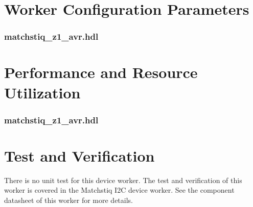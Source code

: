 \documentclass{article}
\def\comp{matchstiq\_z1\_avr}
\edef\ecomp{matchstiq_z1_avr}
\begin{document}
\begin{landscape}
\section*{Worker Configuration Parameters}
\subsubsection*{\comp.hdl}

\section*{Performance and Resource Utilization}
\subsubsection*{\comp.hdl}

\end{landscape}

\section*{Test and Verification}
There is no unit test for this device worker. The test and verification of this worker is covered in the Matchstiq I2C device worker. See the component datasheet of this worker for more details.
\end{document}
